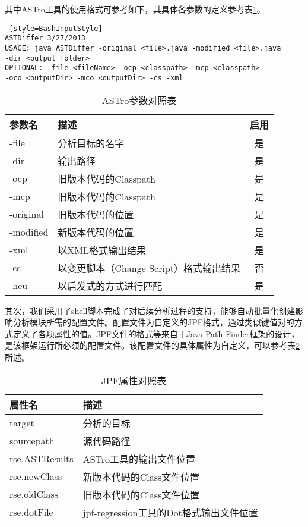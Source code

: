 其中ASTro工具的使用格式可参考如下，其具体各参数的定义参考表\ref {ASTro}。

\begin{lstlisting} [style=BashInputStyle]
ASTDiffer 3/27/2013
USAGE: java ASTDiffer -original <file>.java -modified <file>.java 
-dir <output folder>
OPTIONAL: -file <fileName> -ocp <classpath> -mcp <classpath> 
-oco <outputDir> -mco <outputDir> -cs -xml
\end{lstlisting}	

\begin{table}
	\caption{ASTro参数对照表}
	\label{ASTro}
	\centering
	\begin{tabular}{llc}
		\toprule[1.5pt] 
		{\heiti 参数名} & {\heiti 描述} & {\heiti 启用}\\\midrule[1pt]
		-file & 分析目标的名字 & 是 \\
		-dir & 输出路径 & 是 \\
		-ocp & 旧版本代码的Classpath & 是\\
		-mcp & 旧版本代码的Classpath & 是\\
		-original    & 旧版本代码的位置 & 是\\
		-modified   & 新版本代码的位置 & 是\\
		-xml   & 以XML格式输出结果 & 是\\
		-cs   & 以变更脚本（Change Script）格式输出结果 & 否\\
		-heu   & 以启发式的方式进行匹配 & 是\\
		\bottomrule[1.5pt]
	\end{tabular}	
\end{table}

其次，我们采用了shell脚本完成了对后续分析过程的支持，能够自动批量化创建影响分析模块所需的配置文件。配置文件为自定义的JPF格式，通过类似键值对的方式定义了各项属性的值。JPF文件的格式等来自于Java Path Finder框架的设计，是该框架运行所必须的配置文件。该配置文件的具体属性为自定义，可以参考表\ref {JPF_prop}所述。

\begin{table}
	\caption{JPF属性对照表}
	\label{JPF_prop}
	\centering
	    \begin{tabular*}{\linewidth}{lp{10cm}}
	    	\toprule[1.5pt]
	    	{\heiti 属性名} & {\heiti 描述} \\\midrule[1pt]
	    	target & 分析的目标 \\
	    	sourcepath & 源代码路径\\
	    	rse.ASTResults & ASTro工具的输出文件位置\\
	    	rse.newClass & 新版本代码的Class文件位置\\
	    	rse.oldClass    & 旧版本代码的Class文件位置\\
	    	rse.dotFile   & jpf-regression工具的Dot格式输出文件位置\\
	    	\bottomrule[1.5pt]
	    \end{tabular*}
\end{table}

